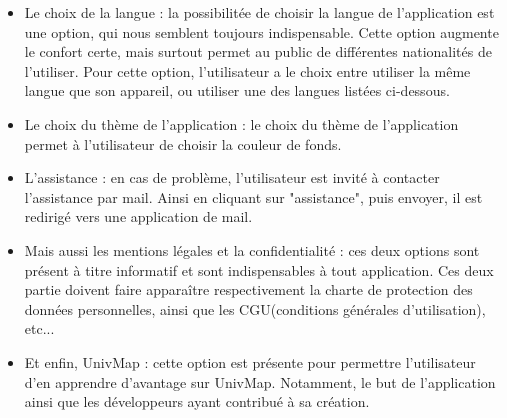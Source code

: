 \documentclass{article}
\begin{document}
\begin{itemize}
    \item Le choix de la langue : la possibilitée de choisir la langue de l'application est une option, qui nous semblent toujours indispensable.
    Cette option augmente le confort certe, mais surtout permet au public de différentes nationalités de l'utiliser.
    Pour cette option, l'utilisateur a le choix entre utiliser la même langue que son appareil, ou utiliser une des langues listées ci-dessous.   

    \item Le choix du thème de l'application : le choix du thème de l'application permet à l'utilisateur de choisir la couleur de fonds.
    
    \item L'assistance : en cas de problème, l'utilisateur est invité à contacter l'assistance par mail. Ainsi en cliquant sur "assistance",
    puis envoyer, il est redirigé vers une application de mail. 
    
    \item Mais aussi les mentions légales et la confidentialité : ces deux options sont présent à titre informatif et sont indispensables à tout
    application. Ces deux partie doivent faire apparaître respectivement la charte de protection des données personnelles,
    ainsi que les CGU(conditions générales d'utilisation), etc...
    
    \item Et enfin, UnivMap : cette option est présente pour permettre l'utilisateur d'en apprendre d'avantage sur UnivMap. Notamment,
    le but de l'application ainsi que les développeurs ayant contribué à sa création.
    
\end{itemize}

\vspace{10pt}   %
\end{document}
